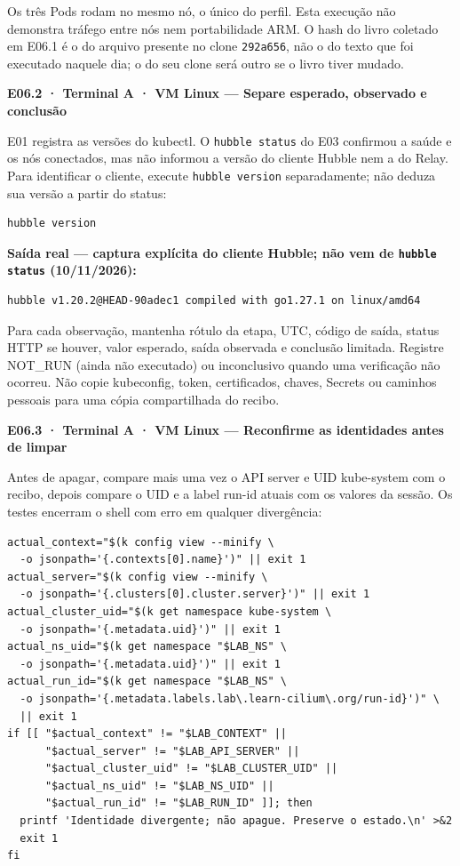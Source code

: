 \documentclass[12pt,openany,oneside,a4paper,chapter=TITLE,english,brazil]{abntex2}
\begin{document}
Os três Pods rodam no mesmo nó, o único do perfil. Esta execução não demonstra tráfego entre nós nem portabilidade ARM. O hash do livro coletado em E06.1 é o do arquivo presente no clone \texttt{292a656}, não o do texto que foi executado naquele dia; o do seu clone será outro se o livro tiver mudado.

\textbf{E06.2 · Terminal A · VM Linux --- Separe esperado, observado e conclusão}

E01 registra as versões do kubectl. O \texttt{hubble status} do E03 confirmou a saúde e os nós conectados, mas não informou a versão do cliente Hubble nem a do Relay. Para identificar o cliente, execute \texttt{hubble version} separadamente; não deduza sua versão a partir do status:

\begin{verbatim}
hubble version
\end{verbatim}

\textbf{Saída real --- captura explícita do cliente Hubble; não vem de \texttt{hubble status} (10/11/2026):}

\begin{verbatim}
hubble v1.20.2@HEAD-90adec1 compiled with go1.27.1 on linux/amd64
\end{verbatim}

Para cada observação, mantenha rótulo da etapa, UTC, código de saída, status HTTP se houver, valor esperado, saída observada e conclusão limitada. Registre NOT\_RUN (ainda não executado) ou inconclusivo quando uma verificação não ocorreu. Não copie kubeconfig, token, certificados, chaves, Secrets ou caminhos pessoais para uma cópia compartilhada do recibo.

\textbf{E06.3 · Terminal A · VM Linux --- Reconfirme as identidades antes de limpar}

Antes de apagar, compare mais uma vez o API server e UID kube-system com o recibo, depois compare o UID e a label run-id atuais com os valores da sessão. Os testes encerram o shell com erro em qualquer divergência:

\begin{verbatim}
actual_context="$(k config view --minify \
  -o jsonpath='{.contexts[0].name}')" || exit 1
actual_server="$(k config view --minify \
  -o jsonpath='{.clusters[0].cluster.server}')" || exit 1
actual_cluster_uid="$(k get namespace kube-system \
  -o jsonpath='{.metadata.uid}')" || exit 1
actual_ns_uid="$(k get namespace "$LAB_NS" \
  -o jsonpath='{.metadata.uid}')" || exit 1
actual_run_id="$(k get namespace "$LAB_NS" \
  -o jsonpath='{.metadata.labels.lab\.learn-cilium\.org/run-id}')" \
  || exit 1
if [[ "$actual_context" != "$LAB_CONTEXT" ||
      "$actual_server" != "$LAB_API_SERVER" ||
      "$actual_cluster_uid" != "$LAB_CLUSTER_UID" ||
      "$actual_ns_uid" != "$LAB_NS_UID" ||
      "$actual_run_id" != "$LAB_RUN_ID" ]]; then
  printf 'Identidade divergente; não apague. Preserve o estado.\n' >&2
  exit 1
fi
\end{verbatim}
\end{document}
